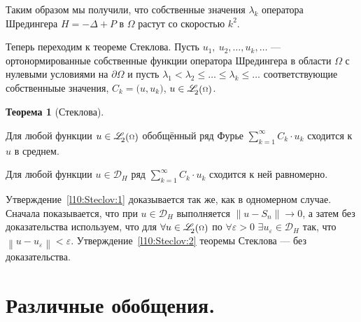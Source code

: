 \documentclass[12pt,a4paper,openany,fleqn]{book}
\newcommand{\mc}[1]{\ensuremath{\mathcal{#1}}}
\newcommand{\eps}{\varepsilon}
\newcommand{\norm}[1]{\ensuremath{\left\|#1\right\|}}
\newcommand{\fLr}[1][{[a,b];\rho}]{\ensuremath{\mathscr{L}\hspace*{-0.11 cm}{\mathstrut}_{2}{\scriptstyle\left(\vphantom{A^b}#1\right)}}}
\theoremstyle{definition}
\newtheorem{_teor}{Теорема}[section]
\begin{document}
	Таким образом мы получили, что собственные значения $\lambda_k$ оператора Шредингера $H=-\Delta+P$ в $\Omega$ растут со скоростью $k^2$. 
	
	Теперь переходим к теореме Стеклова. Пусть $u_1,\ u_2,\ldots,u_k,\ldots$ --- ортонормированные собственные функции оператора Шредингера в области $\Omega$ с нулевыми условиями на $\partial\Omega$ и пусть $\lambda_1<\lambda_2\leqslant\ldots\leqslant\lambda_k\leqslant\ldots$ соответствующие собственныые значения, $C_k=\big(u,u_k\big)$, $u\in\fLr[\Omega]$. 
	\begin{_teor}[Стеклова]\hfill
		\begin{enumerate1}
			\item\label{l10:Steclov:1} Для любой функции $u\in\fLr[\Omega]$ обобщённый ряд Фурье $\displaystyle\sum\limits_{k=1}^{\infty}C_k\cdot u_k$ сходится к $u$ в среднем.
			\item\label{l10:Steclov:2} Для любой функции $u\in\mc{D}_{H}$ ряд  $\displaystyle\sum\limits_{k=1}^{\infty}C_k\cdot u_k$ сходится к ней равномерно.
		\end{enumerate1}
	\end{_teor}
	Утверждение~\ref{l10:Steclov:1} доказывается так же, как в одномерном случае. Сначала показывается, что при $u\in\mc{D}_H$ выполняется $\norm{u-S_n}\to0$, а затем без доказательства используем, что для $\forall u\in\fLr[\Omega]$ по $\forall\eps>0$ $\exists u_{\eps}\in\mc{D}_H$ так, что $\norm{u-u_{\eps}}<\eps$. Утверждение~\ref{l10:Steclov:2} теоремы Стеклова --- без доказательства.
	
	\section{Различные обобщения.}
	\label{lecture10section2}
\end{document}
